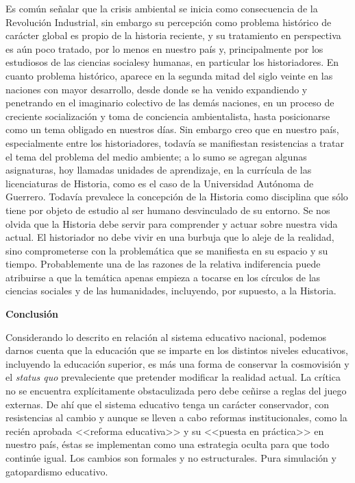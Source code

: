Es común señalar que la crisis ambiental se inicia como consecuencia de 
la Revolución Industrial, sin embargo su percepción como problema 
histórico de carácter global es propio de la historia reciente, y su 
tratamiento en perspectiva es aún poco tratado, por lo menos en nuestro 
país y, principalmente por los estudiosos de las ciencias sociales\linebreak y 
humanas, en particular los historiadores. En cuanto problema histórico, 
aparece en la segunda mitad del siglo veinte en las naciones con mayor 
desarrollo, desde donde se ha venido expandiendo y penetrando en el 
imaginario colectivo de las demás naciones, en un proceso de creciente 
socialización y toma de conciencia ambientalista, hasta posicionarse 
como un tema obligado en nuestros días. Sin embargo creo que en nuestro 
país, especialmente entre los historiadores, todavía se manifiestan 
resistencias a tratar el tema del problema del medio ambiente; a lo 
sumo se agregan algunas asignaturas, hoy llamadas unidades de 
aprendizaje, en la currícula de las licenciaturas de Historia, como es 
el caso de la Universidad Autónoma de Guerrero. Todavía prevalece la 
concepción de la Historia como disciplina  que sólo tiene por objeto de 
estudio al ser humano desvinculado de su entorno. Se nos olvida que la 
Historia debe servir para comprender y actuar sobre nuestra vida 
actual. El historiador no debe vivir en una burbuja que lo aleje de la 
realidad, sino comprometerse con  la problemática que se manifiesta en 
su espacio y su tiempo. Probablemente una de las razones de la relativa 
indiferencia puede atribuirse a que la temática apenas empieza a 
tocarse en los círculos de las ciencias sociales y de las humanidades, 
incluyendo, por supuesto, a la Historia.

\bigskip
{\bfseries Conclusión}

Considerando lo descrito en relación al sistema educativo nacional, 
podemos darnos cuenta que la educación que se imparte en los distintos 
niveles educativos, incluyendo la educación superior, es más una forma 
de conservar la cosmovisión y el \textit{status quo} prevaleciente que 
pretender modificar la realidad actual. La crítica no se encuentra 
explícitamente obstaculizada pero debe ceñirse a reglas del juego 
externas. De ahí que el sistema educativo tenga un carácter 
conservador, con resistencias al cambio y aunque se lleven a cabo 
reformas institucionales, como la recién aprobada <<reforma educativa>> y 
su <<puesta en práctica>> en nuestro país, éstas se implementan como una 
estrategia oculta para que todo continúe igual. Los cambios son 
formales y no estructurales. Pura simulación y gatopardismo educativo.  

